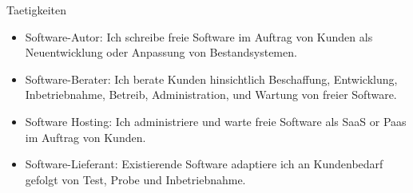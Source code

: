
\begin{frame}{Taetigkeiten}
  \begin{itemize}
  \item Software-Autor: Ich schreibe freie Software im Auftrag von Kunden als Neuentwicklung oder Anpassung von Bestandsystemen.
  \item Software-Berater: Ich berate Kunden hinsichtlich Beschaffung, Entwicklung, Inbetriebnahme, Betreib, Administration, und Wartung von freier Software.
  \item Software Hosting: Ich administriere und warte freie Software als SaaS or Paas im Auftrag von Kunden.
  \item Software-Lieferant: Existierende Software adaptiere ich an Kundenbedarf gefolgt von Test, Probe und Inbetriebnahme.
  \end{itemize}
\end{frame}



